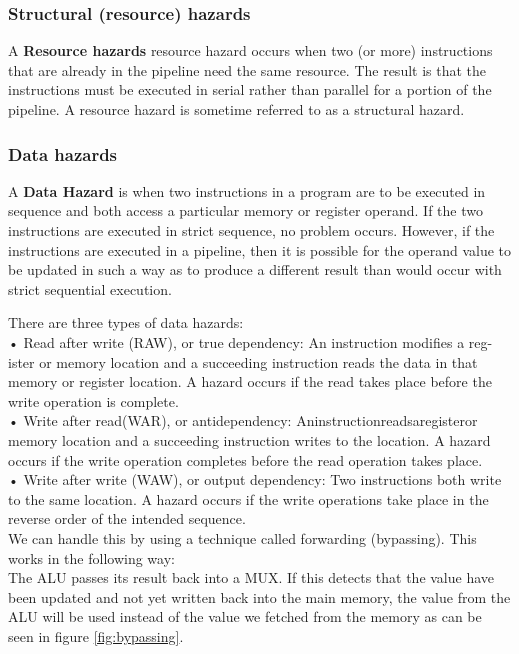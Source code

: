 \documentclass[titlepage, a4paper]{article}
\begin{document}
\subsubsection{Structural (resource) hazards}
A \textbf{Resource hazards} resource hazard occurs when two (or more) instructions that are already in the pipeline need the same resource. The result is that the instructions must be executed in serial rather than parallel for a portion of the pipeline. A resource hazard is sometime referred to as a structural hazard.

\subsubsection{Data hazards}
A \textbf{Data Hazard} is when two instructions in a program are to be executed in sequence and both access a particular memory or register operand. If the two instructions are executed in strict sequence, no problem occurs. However, if the instructions are executed in a pipeline, then it is possible for the operand value to be updated in such a way as to produce a different result than would occur with strict sequential execution.

There are three types of data hazards: \\
• Read after write (RAW), or true dependency: An instruction modifies a reg- ister or memory location and a succeeding instruction reads the data in that memory or register location. A hazard occurs if the read takes place before the write operation is complete. \\
• Write after read(WAR), or antidependency: Aninstructionreadsaregisteror memory location and a succeeding instruction writes to the location. A hazard occurs if the write operation completes before the read operation takes place. \\
• Write after write (WAW), or output dependency: Two instructions both write to the same location. A hazard occurs if the write operations take place in the reverse order of the intended sequence. \\

We can handle this by using a technique called forwarding (bypassing). This works in the following way: \\
The ALU passes its result back into a MUX. If this detects that the value have been updated and not yet written back into the main memory, the value from the ALU will be used instead of the value we fetched from the memory as can be seen in figure \ref{fig:bypassing}.
\end{document}
